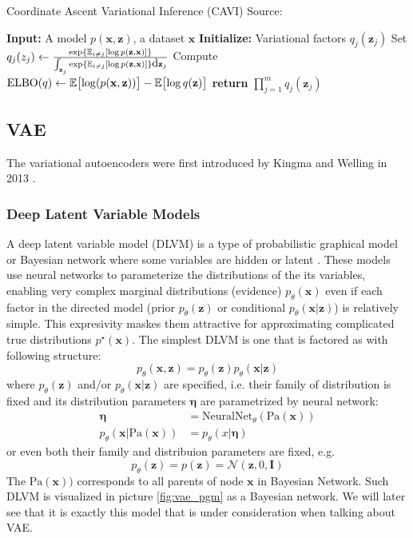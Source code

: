 \begin{algorithm}
    \caption[CAVI algorithm]{Coordinate Ascent Variational Inference (CAVI) Source: \cite{intro-variational-blog-2019}}
    \label{alg:cavi}
    \begin{algorithmic}[2]
      \State \textbf{Input:} A model $p(\mathbf{x},\mathbf{z})$, a dataset $\mathbf{x}$
      \State \textbf{Initialize:} Variational factors $q_j(\mathbf{z}_j)$
          \State Set $q_j(z_j) \gets \frac{\exp{\operatorname{\mathbb{E}}_{i \neq j} [\log p(\mathbf{z},\mathbf{x})]}}{\int_{\mathbf{z}_j}\exp{\operatorname{\mathbb{E}}_{i \neq j} [\log p(\mathbf{z},\mathbf{x})]}\mbox{\rm d}\mathbf{z}_j}$
        \EndFor
        \State Compute $\mathrm{ELBO}(q) \gets \operatorname{\mathbb{E}} \bigl[\log(p(\mathbf{x},\mathbf{z}))\bigr] - \operatorname{\mathbb{E}} \bigl[ \log q(\mathbf{z}) \bigr]$
      \EndWhile
      \State \textbf{return} $\prod_{j=1}^m q_j(\mathbf{z}_j)$
    \end{algorithmic}
\end{algorithm}

\subsection{VAE}
\label{subsec:vaes}
The variational autoencoders were first introduced by Kingma and Welling in 2013 \cite{vae-original-2013}.

\subsubsection{Deep Latent Variable Models}
A deep latent variable model (DLVM) is a type of probabilistic graphical model or Bayesian network where some variables are hidden or latent \cite{intro-vae-2019}.
These models use neural networks to parameterize the distributions of the its variables, enabling very complex marginal distributions (evidence)
$p_\theta(\mathbf{x})$ even if each factor in the directed model (prior $p_\theta(\mathbf{z})$ or conditional $p_\theta(\mathbf{x}|\mathbf{z})$)
is relatively simple. This expresivity maskes them attractive for approximating complicated true distributions $p^\star(\mathbf{x})$. 
The simplest DLVM is one that is factored as with following structure:
$$
p_\theta(\mathbf{x},\mathbf{z}) = p_\theta(\mathbf{z})p_\theta(\mathbf{x}|\mathbf{z})
$$
where $p_\theta(\mathbf{z})$ and/or $p_\theta(\mathbf{x}|\mathbf{z})$ are specified, i.e. their family of distribution is fixed and its distribution
parameters $\mathbf{\eta}$ are parametrized by neural network:
\begin{align*}
\mathbf{\eta} &= \mathrm{NeuralNet}_\theta(\text{Pa}(\mathbf{x})) \\
p_\theta(\mathbf{x}|\text{Pa}(\mathbf{x})) &= p_\theta(x|\mathbf{\eta})
\end{align*}
or even both their family and distribuion parameters are fixed, e.g. 
$$
p_\theta(\mathbf{z}) = p(\mathbf{z}) = \mathcal{N}(\mathbf{z},0,\mathbf{I})
$$
The $\text{Pa}(\mathbf{x}))$ corresponds to all parents of node $\mathbf{x}$ in Bayesian Network.
Such DLVM is visualized in picture \ref{fig:vae_pgm} as a Bayesian network. We will later see that 
it is exactly this model that is under consideration when talking about VAE. 

